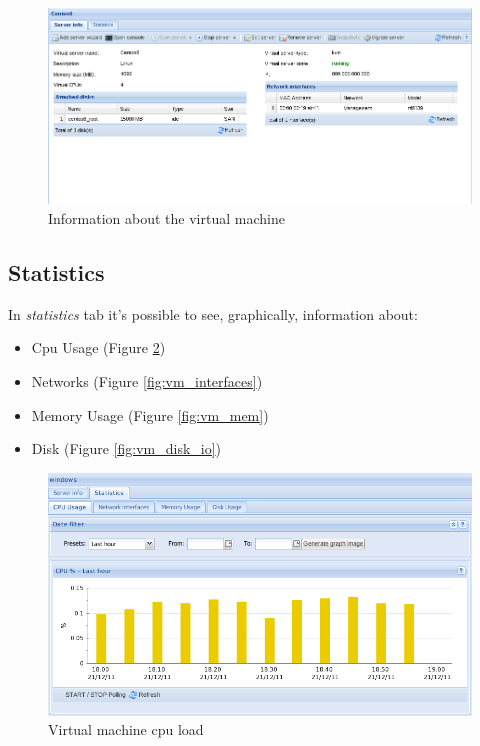 \begin{figure}[H]
	\begin{center}
	\includegraphics[scale=0.45]{screenshots/server_info.png}
	\caption{Information about the virtual machine}
	\label{fig:server_info}
	\end{center}
\end{figure}

\subsection{Statistics}
In \emph{statistics} tab it's possible to see, graphically, information about:
\begin{itemize}
	\item Cpu Usage (Figure \ref{fig:vm_cpuload})
	\item Networks (Figure \ref{fig:vm_interfaces})
	\item Memory Usage (Figure \ref{fig:vm_mem})
	\item Disk (Figure \ref{fig:vm_disk_io})
\end{itemize}


\begin{figure}[H]
	\begin{center}
	\includegraphics[scale=0.45]{screenshots/vm_cpuload.png}
	\caption{Virtual machine cpu load}
	\label{fig:vm_cpuload}
	\end{center}
\end{figure}

